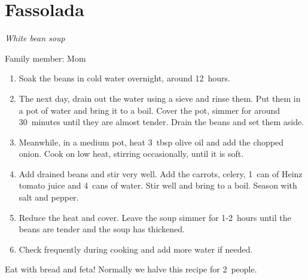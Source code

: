 \chapter{Fassolada}
\label{ch:fassolada}


\textit{White bean soup}

Family member: Mom

\begin{enumerate}
    \item Soak the beans in cold water overnight, around 12~hours.
    \item The next day, drain out the water using a sieve and rinse them. Put them in a pot of water and bring it to a boil. Cover the pot, simmer for around 30~minutes until they are almost tender. Drain the beans and set them aside.
    \item Meanwhile, in a medium pot, heat 3~tbsp olive oil and add the chopped onion. Cook on low heat, stirring occasionally, until it is soft.
    \item Add drained beans and stir very well. Add the carrots, celery, 1~can of Heinz tomato juice and 4~cans of water. Stir well and bring to a boil. Season with salt and pepper.
    \item Reduce the heat and cover. Leave the soup simmer for 1-2~hours until the beans are tender and the soup has thickened.
    \item Check frequently during cooking and add more water if needed.
\end{enumerate}

Eat with bread and feta! Normally we halve this recipe for 2~people.
